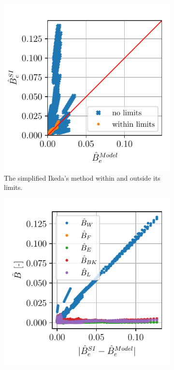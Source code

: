 \begin{figure}[h!]
\centering
    \begin{subfigure}[b]{0.45\textwidth}
    
        \centering
        \includegraphics[width=\textwidth]{kappa/images/si_model_within.pdf}
        \caption{The simplified Ikeda's method within and outside its limits.}
        \label{fig:si_model_within}
    \end{subfigure}
    \hfill
    \begin{subfigure}[b]{0.45\textwidth}
        \centering
        \includegraphics[width=\textwidth]{kappa/images/component_residual.pdf}

\end{subfigure}
\end{figure}
